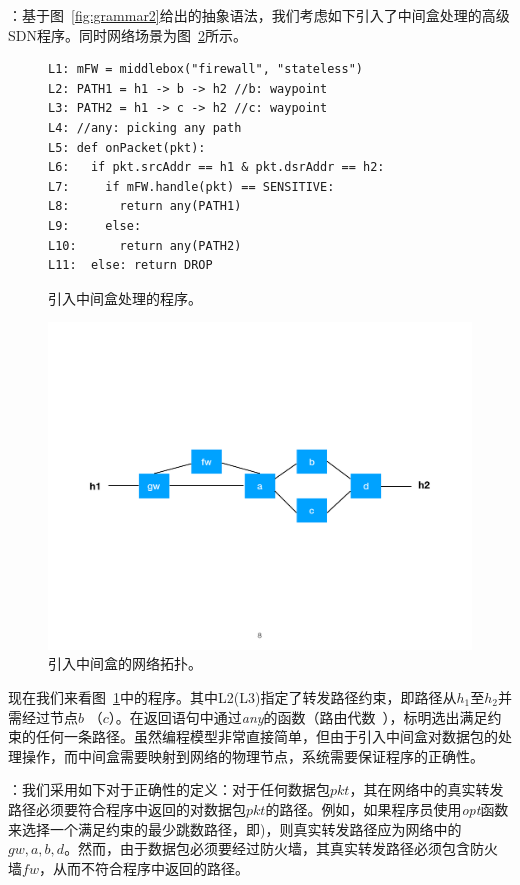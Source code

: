 ：基于图~\ref{fig:grammar2}给出的抽象语法，我们考虑如下引入了中间盒处理的高级SDN程序。同时网络场景为图~\ref{fig:topo2}所示。

\begin{figure}[h]
{\small
\begin{verbatim}
L1: mFW = middlebox("firewall", "stateless")
L2: PATH1 = h1 -> b -> h2 //b: waypoint
L3: PATH2 = h1 -> c -> h2 //c: waypoint
L4: //any: picking any path
L5: def onPacket(pkt):
L6:   if pkt.srcAddr == h1 & pkt.dsrAddr == h2:
L7:     if mFW.handle(pkt) == SENSITIVE:
L8:       return any(PATH1)
L9:     else:
L10:      return any(PATH2)
L11:  else: return DROP
\end{verbatim}
}
    \caption{\small 引入中间盒处理的程序。}
\label{fig:code2}
\end{figure}


\begin{figure}[!htbp]
\includegraphics[width=0.8\linewidth]{figures/global-topo2.pdf}
\centering
\caption{\small 引入中间盒的网络拓扑。}
\label{fig:topo2}
\end{figure}

现在我们来看图~\ref{fig:code2}中的程序。其中L2(L3)指定了转发路径约束，即路径从$h_1$至$h_2$并需经过节点$b$ （$c$）。在返回语句中通过\emph{any}的函数（路由代数~\cite{gao2018t}），标明选出满足约束的任何一条路径。虽然编程模型非常直接简单，但由于引入中间盒对数据包的处理操作，而中间盒需要映射到网络的物理节点，系统需要保证程序的正确性。

：我们采用如下对于正确性的定义：对于任何数据包$pkt$，其在网络中的真实转发路径必须要符合程序中返回的对数据包$pkt$的路径。例如，如果程序员使用\emph{opt}函数来选择一个满足约束的最少跳数路径，即)，则真实转发路径应为网络中的$gw, a, b, d$。然而，由于数据包必须要经过防火墙，其真实转发路径必须包含防火墙$fw$，从而不符合程序中返回的路径。


